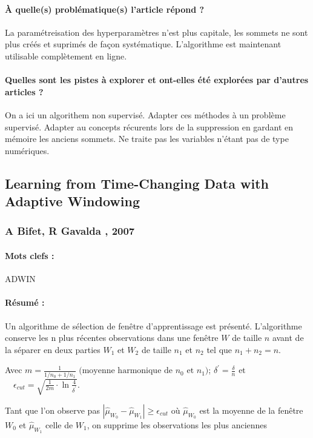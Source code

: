 \documentclass[11pt,a4paper]{report}
\begin{document}
\paragraph{À quelle(s) problématique(s) l'article répond ? } La paramétreisation des hyperparamètres n'est plus capitale, les sommets ne sont plus créés et suprimés de façon systématique. L'algorithme est maintenant utilisable complètement en ligne.

\paragraph{Quelles sont les pistes à explorer et ont-elles  été explorées par d'autres articles ? } On a ici un algorithem non supervisé. Adapter ces méthodes à un problème supervisé. Adapter au concepts récurents lors de la suppression en gardant en mémoire les anciens sommets. Ne traite pas les variables n'étant pas de type numériques.



\subsection{Learning from Time-Changing Data with Adaptive Windowing}
\subsubsection{A Bifet, R Gavalda , 2007}

\paragraph{Mots clefs :} ADWIN

\paragraph{Résumé :} Un algorithme de sélection de fenêtre d’apprentissage est présenté. L’algorithme conserve les n plus récentes observations dans une fenêtre $W$ de taille $n$ avant de la séparer en deux parties $W_1$ et $W_2$ de taille $n_1$ et $n_2$ tel que $n_1+n_2=n$. 

Avec $m=\frac{1}{1 / n_{0}+1 / n_{1}} \text { (moyenne harmonique de } n_{0} \text { et } n_{1} )  $; $\delta^{\prime}=\frac{\delta}{n} \text{ et } $ $ \quad \epsilon_{c u t}=\sqrt{\frac{1}{2 m} \cdot \ln \frac{4}{\delta^{\prime}}}$. 

Tant que l'on observe pas $\left|\hat{\mu}_{W_{0}}-\hat{\mu}_{W_{1}}\right| \geq \epsilon_{c u t}$ où $\hat{\mu}_{W_{0}}$ est la moyenne de la fenêtre $W_0$ et $\hat{\mu}_{W_{1}}$ celle de $W_1$, on supprime les observations les plus anciennes
\end{document}
